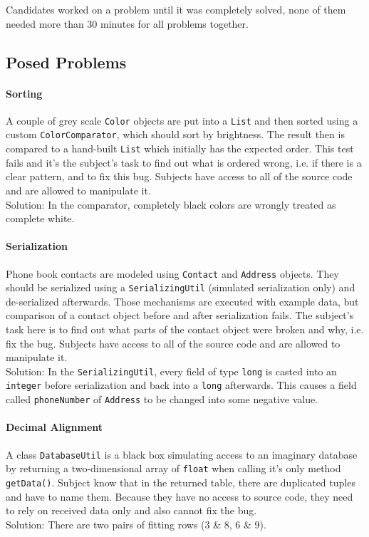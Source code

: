 \documentclass[english]{acm_proc_article-sp}
\begin{document}
Candidates worked on a problem until it was completely solved, none of them needed more than 30 minutes for all problems together.

\subsection{Posed Problems}
\paragraph{Sorting}
A couple of grey scale \verb.Color. 
objects are put into a \verb.List. 
and then sorted using a custom \verb.ColorComparator., which should sort by brightness. 
The result then is compared to a hand-built \verb.List. 
which initially has the expected order. 
This test fails and it's the subject's task to find out what is ordered wrong, i.e. 
if there is a clear pattern, and to fix this bug. 
Subjects have access to all of the source code and are allowed to manipulate it.\\
Solution: In the comparator, completely black colors are wrongly treated as complete white.

\paragraph{Serialization}
Phone book contacts are modeled using \verb.Contact. 
and \verb.Address. 
objects. 
They should be serialized using a \verb.SerializingUtil. 
(simulated serialization only) and de-serialized afterwards.
Those mechanisms are executed with example data, but comparison of a contact object before and after serialization fails. 
The subject's task here is to find out what parts of the contact object were broken and why, i.e. 
fix the bug. 
Subjects have access to all of the source code and are allowed to manipulate it.\\
Solution: In the \verb.SerializingUtil., every field of type \verb.long. 
is casted into an \verb.integer. 
before serialization and back into a \verb.long. 
afterwards. 
This causes a field called \verb.phoneNumber. 
of \verb.Address. 
to be changed into some negative value.

\paragraph{Decimal Alignment}
A class \verb.DatabaseUtil. 
is a black box simulating access to an imaginary database by returning a two-dimensional array of \verb.float. 
when calling it's only method \verb.getData().. 
Subject know that in the returned table, there are duplicated tuples and have to name them. 
Because they have no access to source code, they need to rely on received data only and also cannot fix the bug.\\
Solution: There are two pairs of fitting rows (3 \& 8, 6 \& 9).
\end{document}
